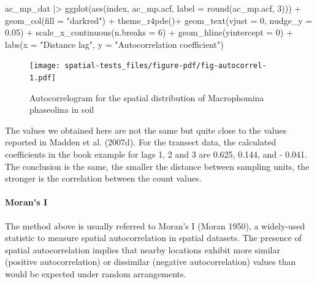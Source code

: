 \documentclass[
  letterpaper,
]{book}
\let\oldparagraph\paragraph
\renewcommand{\paragraph}[1]{\oldparagraph{#1}\mbox{}}
\newenvironment{Shaded}{\begin{snugshade}}{\end{snugshade}}
\newcommand{\AttributeTok}[1]{\textcolor[rgb]{0.40,0.45,0.13}{#1}}
\newcommand{\DecValTok}[1]{\textcolor[rgb]{0.68,0.00,0.00}{#1}}
\newcommand{\FloatTok}[1]{\textcolor[rgb]{0.68,0.00,0.00}{#1}}
\newcommand{\FunctionTok}[1]{\textcolor[rgb]{0.28,0.35,0.67}{#1}}
\newcommand{\NormalTok}[1]{\textcolor[rgb]{0.00,0.23,0.31}{#1}}
\newcommand{\SpecialCharTok}[1]{\textcolor[rgb]{0.37,0.37,0.37}{#1}}
\newcommand{\StringTok}[1]{\textcolor[rgb]{0.13,0.47,0.30}{#1}}
\begin{document}
\begin{Shaded}
\begin{Highlighting}[]
\NormalTok{ac\_mp\_dat }\SpecialCharTok{|\textgreater{}}
  \FunctionTok{ggplot}\NormalTok{(}\FunctionTok{aes}\NormalTok{(index, ac\_mp.acf, }\AttributeTok{label =} \FunctionTok{round}\NormalTok{(ac\_mp.acf, }\DecValTok{3}\NormalTok{))) }\SpecialCharTok{+}
  \FunctionTok{geom\_col}\NormalTok{(}\AttributeTok{fill =} \StringTok{"darkred"}\NormalTok{) }\SpecialCharTok{+}
  \FunctionTok{theme\_r4pde}\NormalTok{()}\SpecialCharTok{+}
  \FunctionTok{geom\_text}\NormalTok{(}\AttributeTok{vjust =} \DecValTok{0}\NormalTok{, }\AttributeTok{nudge\_y =} \FloatTok{0.05}\NormalTok{) }\SpecialCharTok{+}
  \FunctionTok{scale\_x\_continuous}\NormalTok{(}\AttributeTok{n.breaks =} \DecValTok{6}\NormalTok{) }\SpecialCharTok{+}
  \FunctionTok{geom\_hline}\NormalTok{(}\AttributeTok{yintercept =} \DecValTok{0}\NormalTok{) }\SpecialCharTok{+}
  \FunctionTok{labs}\NormalTok{(}\AttributeTok{x =} \StringTok{"Distance lag"}\NormalTok{, }\AttributeTok{y =} \StringTok{"Autocorrelation coefficient"}\NormalTok{)}
\end{Highlighting}
\end{Shaded}

\begin{figure}[H]

{\centering \texttt{[image: spatial-tests\_files/figure-pdf/fig-autocorrel-1.pdf]}

}

\caption{\label{fig-autocorrel}Autocorrelogram for the spatial
distribution of Macrophomina phaseolina in soil}

\end{figure}

The values we obtained here are not the same but quite close to the
values reported in Madden et al. (2007d). For the transect data, the
calculated coefficients in the book example for lags 1, 2 and 3 are
0.625, 0.144, and - 0.041. The conclusion is the same, the smaller the
distance between sampling units, the stronger is the correlation between
the count values.

\hypertarget{morans-i}{%
\paragraph{Moran's I}\label{morans-i}}

The method above is usually referred to Moran's I (Moran 1950), a
widely-used statistic to measure spatial autocorrelation in spatial
datasets. The presence of spatial autocorrelation implies that nearby
locations exhibit more similar (positive autocorrelation) or dissimilar
(negative autocorrelation) values than would be expected under random
arrangements.
\end{document}
